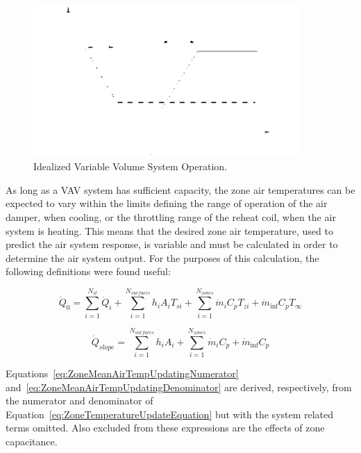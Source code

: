 \begin{figure}[hbtp] %
\centering
\includegraphics[width=0.9\textwidth, height=0.9\textheight, keepaspectratio=true]{media/image34.svg.png}
\caption{Idealized Variable Volume System Operation. \protect \label{fig:idealized-variable-volume-system-operation.}}
\end{figure}

As long as a VAV system has sufficient capacity, the zone air temperatures can be expected to vary within the limits defining the range of operation of the air damper, when cooling, or the throttling range of the reheat coil, when the air system is heating. This means that the desired zone air temperature, used to predict the air system response, is variable and must be calculated in order to determine the air system output. For the purposes of this calculation, the following definitions were found useful:

\begin{equation}
{\dot Q_0} = \sum\limits_{i = 1}^{{N_{sl}}} {{{\dot Q}_i}}  + \sum\limits_{i = 1}^{{N_{surfaces}}} {{h_i}} {A_i}{T_{si}} + \sum\limits_{i = 1}^{{N_{zones}}} {{{\dot m}_i}} {C_p}{T_{zi}} + {\dot m_{\inf }}{C_p}{T_\infty }
\label{eq:ZoneMeanAirTempUpdatingNumerator}
\end{equation}

\begin{equation}
{\dot Q_{slope}} = \sum\limits_{i = 1}^{{N_{surfaces}}} {{h_i}} {A_i} + \sum\limits_{i = 1}^{{N_{zones}}} {{{\dot m}_i}} {C_p} + {\dot m_{\inf }}{C_p}
\label{eq:ZoneMeanAirTempUpdatingDenominator}
\end{equation}

Equations~\ref{eq:ZoneMeanAirTempUpdatingNumerator} and~\ref{eq:ZoneMeanAirTempUpdatingDenominator} are derived, respectively, from the numerator and denominator of Equation~\ref{eq:ZoneTemperatureUpdateEquation} but with the system related terms omitted. Also excluded from these expressions are the effects of zone capacitance.

